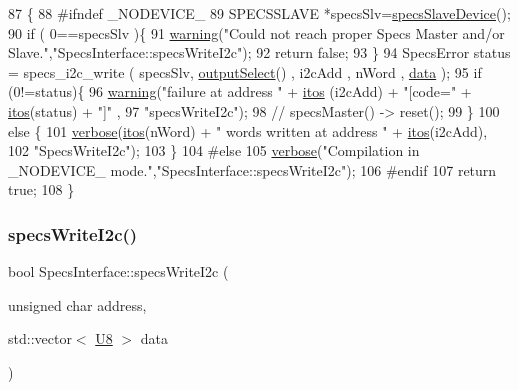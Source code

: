 \begin{DoxyCode}
87                                           \{
88 \textcolor{preprocessor}{#ifndef \_NODEVICE\_
}
89   SPECSSLAVE *specsSlv=\hyperlink{classSpecsInterface_ac8d4711197f484f055533ec1e5ae01a1}{specsSlaveDevice}();
90   \textcolor{keywordflow}{if} ( 0==specsSlv )\{
91     \hyperlink{classObject_a65cd4fda577711660821fd2cd5a3b4c9}{warning}(\textcolor{stringliteral}{"Could not reach proper Specs Master and/or Slave."},\textcolor{stringliteral}{"SpecsInterface::specsWriteI2c"});
92     \textcolor{keywordflow}{return} \textcolor{keyword}{false};
93   \}
94   SpecsError status = specs\_i2c\_write ( specsSlv, \hyperlink{classSpecsInterface_ab291ed03f4c2f0143e14c26ad5f648dd}{outputSelect}() , i2cAdd , nWord , 
      \hyperlink{namespaceshell_a5ea2525995cedc3efd69ea8a7f034d1e}{data} );
95   \textcolor{keywordflow}{if} (0!=status)\{
96     \hyperlink{classObject_a65cd4fda577711660821fd2cd5a3b4c9}{warning}(\textcolor{stringliteral}{"failure at address "} + \hyperlink{Tools_8h_af330027dbdafb9a30768b3613c553e60}{itos} (i2cAdd) + \textcolor{stringliteral}{"[code="} + \hyperlink{Tools_8h_af330027dbdafb9a30768b3613c553e60}{itos}(status) + \textcolor{stringliteral}{"]"} ,
97             \textcolor{stringliteral}{"specsWriteI2c"});
98     \textcolor{comment}{//    specsMaster() -> reset();}
99   \}
100   \textcolor{keywordflow}{else} \{
101     \hyperlink{classObject_a83d2db2df682907ea1115ad721c1c4a1}{verbose}(\hyperlink{Tools_8h_af330027dbdafb9a30768b3613c553e60}{itos}(nWord) + \textcolor{stringliteral}{" words written at address "} + \hyperlink{Tools_8h_af330027dbdafb9a30768b3613c553e60}{itos}(i2cAdd),
102             \textcolor{stringliteral}{"SpecsWriteI2c"});
103   \}
104 \textcolor{preprocessor}{#else
}
105   \hyperlink{classObject_a83d2db2df682907ea1115ad721c1c4a1}{verbose}(\textcolor{stringliteral}{"Compilation in \_NODEVICE\_ mode."},\textcolor{stringliteral}{"SpecsInterface::specsWriteI2c"});
106 \textcolor{preprocessor}{#endif
}
107   \textcolor{keywordflow}{return} \textcolor{keyword}{true};
108 \}
\end{DoxyCode}
\mbox{\label{classSpecsInterface_a00c49357f1f60e3e50de9a51fa127b79}} 
\subsubsection{\texorpdfstring{specs\+Write\+I2c()}{specsWriteI2c()}\hspace{0.1cm}{\footnotesize\ttfamily [2/4]}}
{\footnotesize\ttfamily bool Specs\+Interface\+::specs\+Write\+I2c (\begin{DoxyParamCaption}\item[{unsigned char}]{address,  }\item[{std\+::vector$<$ \hyperlink{ICECALv3_8h_a3cb25ca6f51f003950f9625ff05536fc}{U8} $>$}]{data }\end{DoxyParamCaption})}

